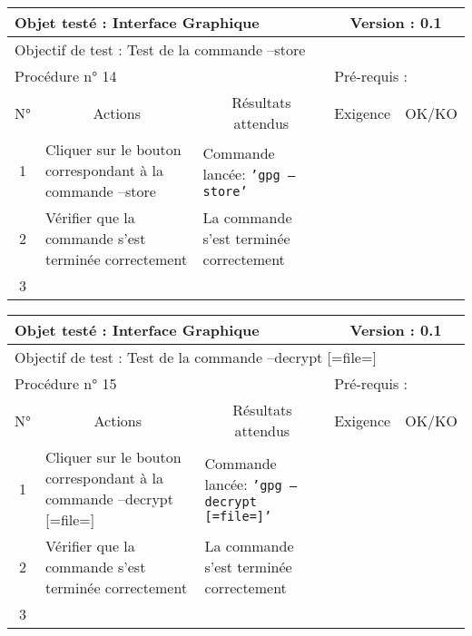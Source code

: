 \documentclass{../res/univ-projet}
\begin{document}
\begin{center}
\begin{tabular}{|c|p{5cm}|p{5cm}|p{1.5cm}|p{1.5cm}|}
\hline
\multicolumn{3}{|l|}{Objet testé : Interface Graphique} & \multicolumn{2}{c|}{Version : 0.1}\\ \hline
\multicolumn{5}{|l|}{Objectif de test : Test de la commande –store}\\ \hline
\multicolumn{3}{|l|}{Procédure n° 14} & \multicolumn{2}{p{3cm}|}{Pré-requis : }\\ \hline
\multicolumn{1}{|c|}{N°} & \multicolumn{1}{c|}{Actions} & \multicolumn{1}{c|}{Résultats attendus} & 
\multicolumn{1}{c|}{Exigence} & \multicolumn{1}{c|}{OK/KO}\\ \hline
1 & Cliquer sur le bouton correspondant à la commande –store & Commande lancée: \texttt{'gpg –store'} &  & \\
2 & Vérifier que la commande s'est terminée correctement & La commande s'est terminée correctement &  & \\
3 &  &  &  & \\ \hline
\end{tabular}
\vskip 2.2cm


\begin{tabular}{|c|p{5cm}|p{5cm}|p{1.5cm}|p{1.5cm}|}
\hline
\multicolumn{3}{|l|}{Objet testé : Interface Graphique} & \multicolumn{2}{c|}{Version : 0.1}\\ \hline
\multicolumn{5}{|l|}{Objectif de test : Test de la commande –decrypt [=file=]}\\ \hline
\multicolumn{3}{|l|}{Procédure n° 15} & \multicolumn{2}{p{3cm}|}{Pré-requis : }\\ \hline
\multicolumn{1}{|c|}{N°} & \multicolumn{1}{c|}{Actions} & \multicolumn{1}{c|}{Résultats attendus} & 
\multicolumn{1}{c|}{Exigence} & \multicolumn{1}{c|}{OK/KO}\\ \hline
1 & Cliquer sur le bouton correspondant à la commande –decrypt [=file=] & Commande lancée: \texttt{'gpg –decrypt [=file=]'} &  & \\
2 & Vérifier que la commande s'est terminée correctement & La commande s'est terminée correctement &  & \\
3 &  &  &  & \\ \hline
\end{tabular}
\vskip 2.2cm



\end{center}
\end{document}
